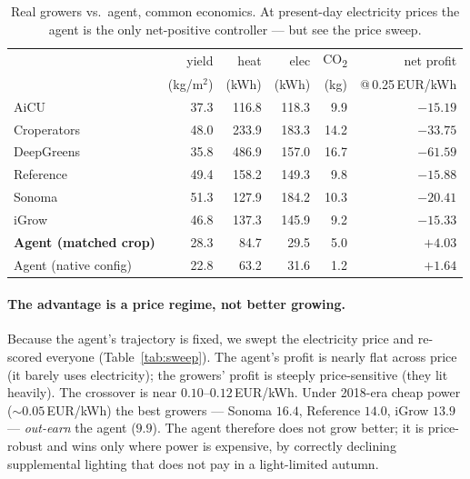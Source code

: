 \documentclass[11pt]{article}
\begin{document}
\begin{table}[h]
\centering
\begin{tabular}{lrrrrr}
\toprule
& yield & heat & elec & CO\textsubscript{2} & net profit \\
& (kg/m$^2$) & (kWh) & (kWh) & (kg) & @\,0.25\,EUR/kWh \\
\midrule
AiCU            & 37.3 & 116.8 & 118.3 &  9.9 & $-15.19$ \\
Croperators     & 48.0 & 233.9 & 183.3 & 14.2 & $-33.75$ \\
DeepGreens      & 35.8 & 486.9 & 157.0 & 16.7 & $-61.59$ \\
Reference       & 49.4 & 158.2 & 149.3 &  9.8 & $-15.88$ \\
Sonoma          & 51.3 & 127.9 & 184.2 & 10.3 & $-20.41$ \\
iGrow           & 46.8 & 137.3 & 145.9 &  9.2 & $-15.33$ \\
\midrule
\textbf{Agent (matched crop)} & 28.3 & 84.7 & 29.5 & 5.0 & $\mathbf{+4.03}$ \\
Agent (native config)         & 22.8 & 63.2 & 31.6 & 1.2 & $+1.64$ \\
\bottomrule
\end{tabular}
\caption{Real growers vs.\ agent, common economics. At present-day electricity
prices the agent is the only net-positive controller --- but see the price sweep.}
\end{table}

\paragraph{The advantage is a price regime, not better growing.}
Because the agent's trajectory is fixed, we swept the electricity price and
re-scored everyone (Table~\ref{tab:sweep}). The agent's profit is nearly flat
across price (it barely uses electricity); the growers' profit is steeply
price-sensitive (they lit heavily). The crossover is near
$0.10$--$0.12$\,EUR/kWh. Under 2018-era cheap power ($\sim 0.05$\,EUR/kWh) the best
growers --- Sonoma $16.4$, Reference $14.0$, iGrow $13.9$ --- \emph{out-earn} the
agent ($9.9$). The agent therefore does not grow better; it is price-robust and
wins only where power is expensive, by correctly declining supplemental lighting
that does not pay in a light-limited autumn.
\end{document}
